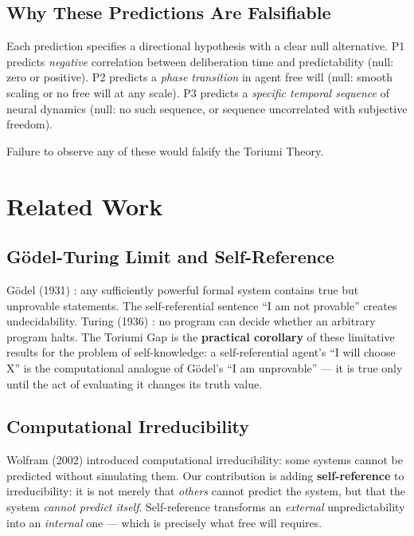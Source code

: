 \documentclass[12pt,a4paper]{article}
\theoremstyle{definition}
\theoremstyle{remark}
\begin{document}
\subsection{Why These Predictions Are Falsifiable}

Each prediction specifies a directional hypothesis with a clear null
alternative. P1 predicts \emph{negative} correlation between deliberation
time and predictability (null: zero or positive). P2 predicts a
\emph{phase transition} in agent free will (null: smooth scaling or
no free will at any scale). P3 predicts a \emph{specific temporal sequence}
of neural dynamics (null: no such sequence, or sequence uncorrelated with
subjective freedom).

Failure to observe any of these would falsify the Toriumi Theory.

\section{Related Work}

\subsection{G\"odel-Turing Limit and Self-Reference}

G\"odel (1931) \cite{godel1931}: any sufficiently powerful formal system
contains true but unprovable statements. The self-referential sentence ``I am
not provable'' creates undecidability. Turing (1936) \cite{turing1936}: no
program can decide whether an arbitrary program halts. The Toriumi Gap is the
\textbf{practical corollary} of these limitative results for the problem of
self-knowledge: a self-referential agent's ``I will choose X'' is the
computational analogue of G\"odel's ``I am unprovable'' --- it is true only
until the act of evaluating it changes its truth value.

\subsection{Computational Irreducibility}

Wolfram (2002) \cite{wolfram2002} introduced computational irreducibility:
some systems cannot be predicted without simulating them. Our contribution
is adding \textbf{self-reference} to irreducibility: it is not merely that
\emph{others} cannot predict the system, but that the system \emph{cannot
predict itself}. Self-reference transforms an \emph{external} unpredictability
into an \emph{internal} one --- which is precisely what free will requires.
\end{document}
